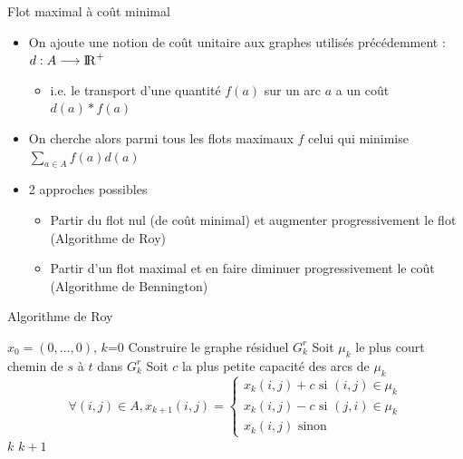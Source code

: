 \begin{frame}{Flot maximal à coût minimal}
    \begin{itemize}
        \item On ajoute une notion de coût unitaire aux graphes utilisés précédemment : $d : A \longrightarrow \mathrm{I\! R}^+$
        \begin{itemize}
            \item i.e. le transport d'une quantité $f(a)$ sur un arc $a$ a un coût $d(a)*f(a)$ 
        \end{itemize}
        \item On cherche alors parmi tous les flots maximaux $f$ celui qui minimise $\sum_{a \in A} f(a)d(a)$
        \item 2 approches possibles 
        \begin{itemize}
            \item Partir du flot nul (de coût minimal) et augmenter progressivement le flot (Algorithme de Roy)
            \item Partir d'un flot maximal et en faire diminuer progressivement le coût (Algorithme de Bennington)
        \end{itemize}
    \end{itemize}
\end{frame}


\begin{frame}{Algorithme de Roy}
\label{alg:roy}
\begin{algorithmic}
    \State $x_0 = (0,...,0)$, $k$=0 
    \State Construire le graphe résiduel $G_k^r$
        \State Soit $\mu_k$ le plus court chemin de $s$ à $t$ dans $G_k^r$
        \State Soit $c$ la plus petite capacité des arcs de $\mu_k$ 
        \State $$\forall (i,j) \in A, x_{k+1}(i,j) = \left\{ 
            \begin{array}{l}
                x_k(i,j)+c \textrm{ si } (i,j) \in \mu_k \\
                x_k(i,j)-c \textrm{ si } (j,i) \in \mu_k \\
                x_k(i,j) \textrm{ sinon}
            \end{array}
            \right. $$
        \State $k$ \gets $k+1$
    \EndWhile
\end{algorithmic}
\end{frame}



